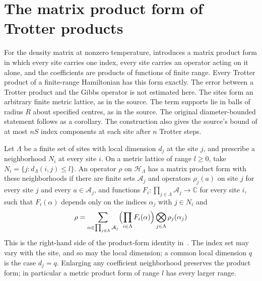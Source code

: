 \section{The matrix product form of Trotter products}
\label{sec:hastings_product_form}


For the density matrix at nonzero temperature, \cite[lines
    1024--1079]{Hastings2006Solving} introduces a matrix product form in which
every site carries one index, every site carries an operator acting on it
alone, and the coefficients are products of functions of finite range. Every
Trotter product of a finite-range Hamiltonian has this form exactly. The error
between a Trotter product and the Gibbs operator is not estimated here. The
sites form an arbitrary finite metric lattice, as in the source. The term supports lie in balls of
radius $R$ about specified centres, as in the source. The original
diameter-bounded statement follows as a corollary. The construction also gives the source's bound of at most $nS$ index components
at each site after $n$ Trotter steps.

\begin{definition}
    \label{def:hastings_product_form}
    \leanok
    Let $\Lambda$ be a finite set of sites with local dimension $d_j$ at the
    site $j$, and prescribe a neighborhood $N_i$ at every site $i$. On a
    metric lattice of range $l\ge0$, take $N_i=\{j:d_\Lambda(i,j)\le l\}$.
    An operator $\rho$ on $\mathcal H_\Lambda$ has a matrix product form
    with these neighborhoods if there are finite sets $\mathcal A_j$ and operators
    $\rho_j(a)$ on site $j$ for every site $j$ and every
    $a\in\mathcal A_j$, and functions
    $F_i\colon\prod_{j\in\Lambda}\mathcal A_j\to\mathbb C$
    for every site $i$, such that $F_i(\alpha)$ depends only on the indices
    $\alpha_j$ with $j\in N_i$ and
    \begin{align}
        \label{eq:hastings_mpf}
        \rho=\sum_{\alpha\in\prod_{j\in\Lambda}\mathcal A_j}
        \Bigl(\prod_{i\in\Lambda}F_i(\alpha)\Bigr)
        \bigotimes_{j\in\Lambda}\rho_j(\alpha_j)
    \end{align}
    This is the right-hand side of the product-form identity in~\cite[lines
        1024--1039]{Hastings2006Solving}. The index set may vary with the site,
    and so may the local dimension; a common local dimension $q$ is the case
    $d_j=q$.
    Enlarging any coefficient neighborhood
    preserves the product form; in particular a metric product form of range
    $l$ has every larger range.
\end{definition}

